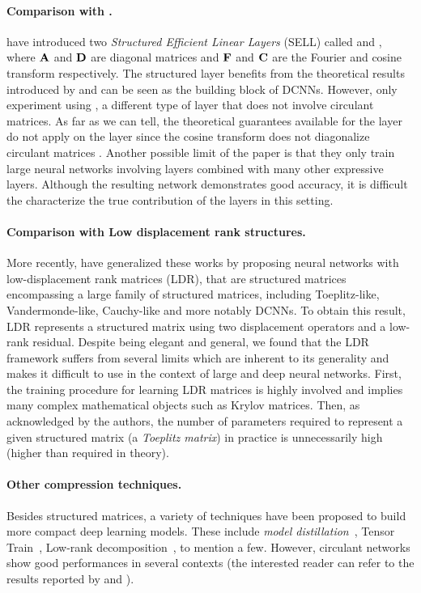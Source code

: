\paragraph{Comparison with \ACDC.}
\citet{moczulski2015acdc} have introduced two \emph{Structured Efficient Linear Layers} (SELL) called \AFDF and \ACDC, where $\mathbf{A}$ and $\mathbf{D}$ are diagonal matrices and $\mathbf{F}$ and $\mathbf{C}$ are the Fourier and cosine transform respectively.
The \AFDF structured layer benefits from the theoretical results introduced by \citet{Huhtanen2015} and can be seen as the building block of DCNNs.
However, \citet{moczulski2015acdc} only experiment using \ACDC, a different type of layer that does not involve circulant matrices.
As far as we can tell, the theoretical guarantees available for the \AFDF layer do not apply on the \ACDC layer since the cosine transform does not diagonalize circulant matrices \cite{sanchez1995diagonalizing}.
Another possible limit of the \ACDC paper is that they only train large neural networks involving \ACDC layers combined with many other expressive layers.
Although the resulting network demonstrates good accuracy, it is difficult the characterize the true contribution of the \ACDC layers in this setting. 

\paragraph{Comparison with Low displacement rank structures.}
More recently, \citet{Thomas_NIPS2018_8119} have generalized these works by proposing neural networks with low-displacement rank matrices (LDR), that are structured matrices encompassing a large family of structured matrices, including Toeplitz-like, Vandermonde-like, Cauchy-like and more notably DCNNs.
To obtain this result, LDR represents a structured matrix using two displacement operators and a low-rank residual.
Despite being elegant and general, we found that the LDR framework suffers from several limits which are inherent to its generality and makes it difficult to use in the context of large and deep neural networks.
First, the training procedure for learning LDR matrices is highly involved and implies many complex mathematical objects such as Krylov matrices.
Then, as acknowledged by the authors, the number of parameters required to represent a given structured matrix (a \emph{Toeplitz matrix}) in practice is unnecessarily high (higher than required in theory). 

\paragraph{Other compression techniques.}
Besides structured matrices, a variety of techniques have been proposed to build more compact deep learning models.
These include \emph{model distillation}~\cite{44873}, Tensor Train~\cite{novikov2015tensorizing}, Low-rank decomposition~\cite{NIPS2013_5025}, to mention a few.
However, circulant networks show good performances in several contexts (the interested reader can refer to the results reported by \citet{moczulski2015acdc} and \citet{Thomas_NIPS2018_8119}).


